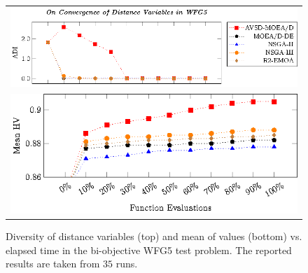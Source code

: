 \begin{figure}[t]
\centering
\begin{tabular}{l}
 \includegraphics[scale=0.75]{images/Diversity_Long_Term_tikz_WFG5-figure0.eps}\\[0cm]%
 \includegraphics[scale=0.75]{images/Diversity_Long_Term_tikz_WFG5-figure1.eps}\\[0cm]%
\end{tabular}
\caption{Diversity of distance variables (top) and mean of \HV{} values (bottom) vs. elapsed time in the bi-objective WFG5 test problem. The reported results are taken from $35$ runs.}\label{fig:WFG5_Diversity}
\end{figure}



